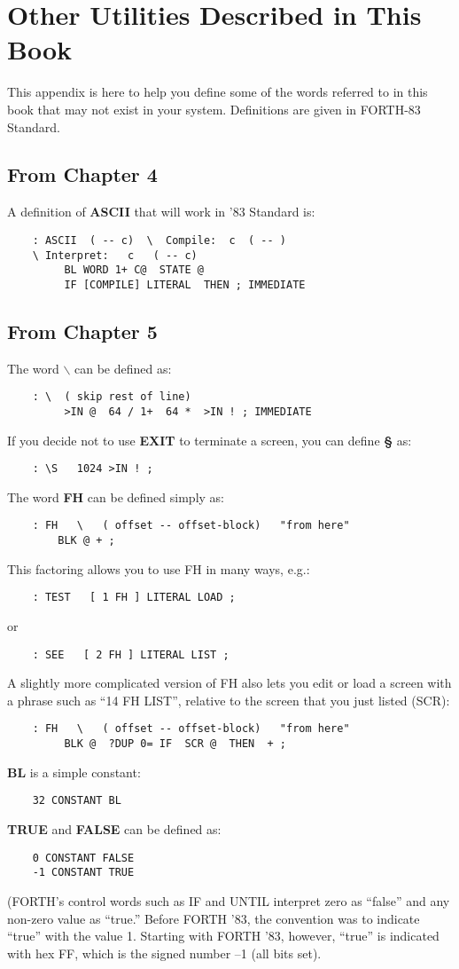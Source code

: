 \chapter{
Other Utilities
Described
in This Book
}
This appendix is here to help you define some of the words referred to in 
this book that may not exist in your system.  Definitions are given in
FORTH-83 Standard.
\section{From Chapter 4}
A definition of {\bf ASCII} that will work in '83 Standard is:
\begin{verbatim}
    : ASCII  ( -- c)  \  Compile:  c  ( -- )
    \ Interpret:   c   ( -- c)
         BL WORD 1+ C@  STATE @
         IF [COMPILE] LITERAL  THEN ; IMMEDIATE
\end{verbatim}
\section{From Chapter 5}
The word {\bf $\backslash$} can be defined as:
\begin{verbatim}
    : \  ( skip rest of line)
         >IN @  64 / 1+  64 *  >IN ! ; IMMEDIATE
\end{verbatim}
If you decide not to use {\bf EXIT} to terminate a screen, you can define {\bf \S}
as:
\begin{verbatim}
    : \S   1024 >IN ! ;
\end{verbatim}
The word {\bf FH} can be defined simply as:
\begin{verbatim}
    : FH   \   ( offset -- offset-block)   "from here"
        BLK @ + ;
\end{verbatim}
This factoring allows you to use FH in many ways, e.g.:
\begin{verbatim}
    : TEST   [ 1 FH ] LITERAL LOAD ;
\end{verbatim}
or
\begin{verbatim}
    : SEE   [ 2 FH ] LITERAL LIST ;
\end{verbatim}
A slightly more complicated version of FH also lets you edit or load a 
screen with a phrase such as ``14 FH LIST'', relative to the screen that 
you just listed (SCR):
\begin{verbatim}
    : FH   \   ( offset -- offset-block)   "from here"
         BLK @  ?DUP 0= IF  SCR @  THEN  + ;
\end{verbatim}
{\bf BL} is a simple constant:
\begin{verbatim}
    32 CONSTANT BL
\end{verbatim}
{\bf TRUE} and {\bf FALSE} can be defined as:
\begin{verbatim}
    0 CONSTANT FALSE
    -1 CONSTANT TRUE
\end{verbatim}
(FORTH's control words such as IF and UNTIL interpret zero as ``false'' 
and any non-zero value as ``true.''  Before FORTH '83, the convention
was to indicate ``true'' with the value 1.  Starting with FORTH '83,
however, ``true'' is indicated with hex FF, which is the signed number --1
(all bits set).

